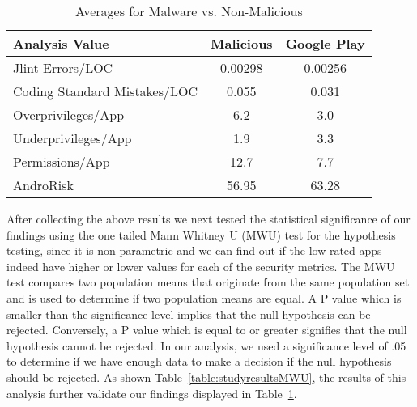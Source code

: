 \documentclass{sig-alternate}
\newcommand{\dan}[1]{\textcolor{blue}{{\it [Dan says: #1]}}}
\begin{document}
\begin{table}[h]
\begin{center}
\caption{Averages for Malware vs. Non-Malicious}
\label{Table:maliciousvsnonmalicious}
  \begin{tabular}{ | l | c | c | } \hline

     \bfseries Analysis Value  & \bfseries Malicious & \bfseries Google Play \\ \hline


    Jlint Errors/LOC & 0.00298 & 0.00256 \\ \hline
    Coding Standard Mistakes/LOC & 0.055 & 0.031 \\ \hline
    Overprivileges/App & 6.2 & 3.0 \\ \hline
    Underprivileges/App & 1.9 & 3.3 \\ \hline
    Permissions/App & 12.7 & 7.7 \\ \hline
	AndroRisk & 56.95 & 63.28 \\ \hline

  \end{tabular}
  \end{center}
\end{table}

After collecting the above results we next tested the statistical significance of our findings using the one tailed Mann Whitney U (MWU) test for the hypothesis testing, since it is non-parametric and we can find out if the low-rated apps indeed have higher or lower values for each of the security metrics. The MWU test compares two population means that originate from the same population set and is used to determine if two population means are equal. A P value which is smaller than the significance level implies that the null hypothesis can be rejected. Conversely, a P value which is equal to or greater signifies that the null hypothesis cannot be rejected. In our analysis, we used a significance level of .05 to determine if we have enough data to make a decision if the null hypothesis should be rejected. As shown Table~\ref{table:studyresultsMWU}, the results of this analysis further validate our findings displayed in Table~\ref{Table:maliciousvsnonmalicious}.
\end{document}
